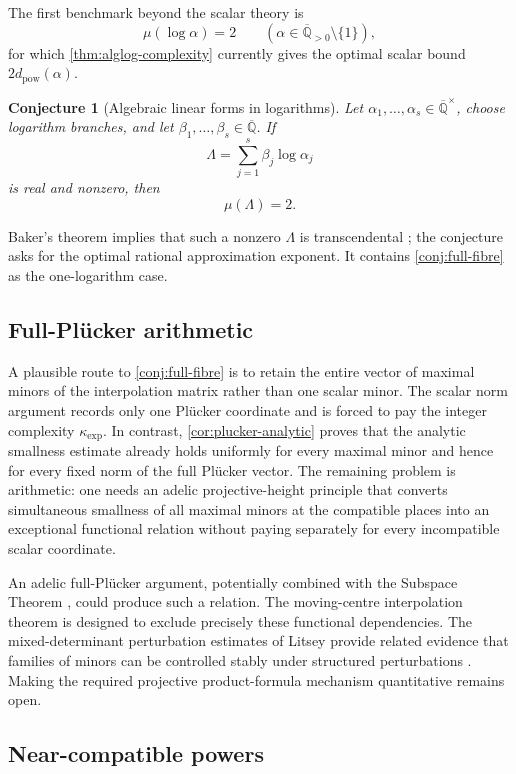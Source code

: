 \documentclass[11pt]{article}
\newcommand{\Qbar}{\overline{\mathbb Q}}
\newtheorem{conjecture}[theorem]{Conjecture}
\theoremstyle{definition}
\theoremstyle{remark}
\numberwithin{equation}{section}
\begin{document}
The first benchmark beyond the scalar theory is
\[
 \mu(\log\alpha)=2
 \qquad
 (\alpha\in\Qbar_{>0}\setminus\{1\}),
\]
for which \cref{thm:alglog-complexity} currently gives the optimal
scalar bound $2d_{\mathrm{pow}}(\alpha)$.

\begin{conjecture}[Algebraic linear forms in logarithms]
\label{conj:linear-forms}
Let $\alpha_1,\ldots,\alpha_s\in\Qbar^\times$, choose logarithm
branches, and let $\beta_1,\ldots,\beta_s\in\Qbar$.  If
\[
 \Lambda=\sum_{j=1}^s\beta_j\log\alpha_j
\]
is real and nonzero, then
\[
 \boxed{\mu(\Lambda)=2.}
\]
\end{conjecture}

Baker's theorem implies that such a nonzero $\Lambda$ is transcendental
\cite[Chapter~2]{Baker1975}; the conjecture asks for the optimal rational
approximation exponent.  It contains \cref{conj:full-fibre} as the
one-logarithm case.

\subsection{Full-Pl\"ucker arithmetic}

A plausible route to \cref{conj:full-fibre} is to retain the entire
vector of maximal minors of the interpolation matrix rather than one
scalar minor.  The scalar norm argument records only one Pl\"ucker
coordinate and is forced to pay the integer complexity
$\kappa_{\exp}$.  In contrast, \cref{cor:plucker-analytic} proves that the
analytic smallness estimate already holds uniformly for every maximal
minor and hence for every fixed norm of the full Pl\"ucker vector.  The
remaining problem is arithmetic: one needs an adelic projective-height
principle that converts simultaneous smallness of all maximal minors at
the compatible places into an exceptional functional relation without
paying separately for every incompatible scalar coordinate.

An adelic full-Pl\"ucker argument, potentially combined with the
Subspace Theorem \cite{Schmidt1980}, could produce such a relation.  The
moving-centre interpolation theorem is designed to exclude precisely
these functional dependencies.  The mixed-determinant perturbation
estimates of Litsey provide related evidence that families of minors can
be controlled stably under structured perturbations
\cite[Sections~5.2--5.6]{Litsey2026}.  Making the required projective
product-formula mechanism quantitative remains open.

\subsection{Near-compatible powers}
\end{document}
